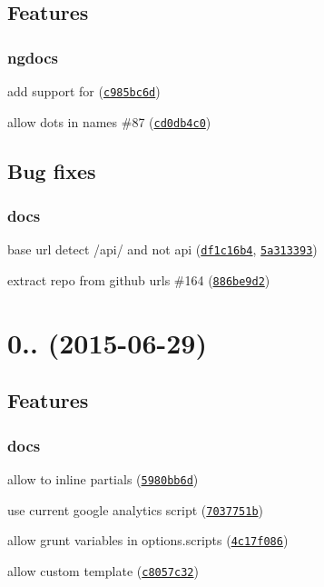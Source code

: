 \subsection*{Features}

\subsubsection*{ngdocs}


\begin{DoxyItemize}
\item add support for  (\href{https://github.com/m7r/grunt-ngdocs/commit/c985bc6d}{\tt c985bc6d})
\item allow dots in names \#87 (\href{https://github.com/m7r/grunt-ngdocs/commit/cd0db4c0}{\tt cd0db4c0})
\end{DoxyItemize}

\subsection*{Bug fixes}

\subsubsection*{docs}


\begin{DoxyItemize}
\item base url detect /api/ and not api (\href{https://github.com/m7r/grunt-ngdocs/commit/df1c16b4}{\tt df1c16b4}, \href{https://github.com/m7r/grunt-ngdocs/commit/5a313393}{\tt 5a313393})
\item extract repo from github urls \#164 (\href{https://github.com/m7r/grunt-ngdocs/commit/886be9d2}{\tt 886be9d2})
\end{DoxyItemize}

\section*{0.. (2015-\/06-\/29)}

\subsection*{Features}

\subsubsection*{docs}


\begin{DoxyItemize}
\item allow to inline partials (\href{https://github.com/m7r/grunt-ngdocs/commit/5980bb6d}{\tt 5980bb6d})
\item use current google analytics script (\href{https://github.com/m7r/grunt-ngdocs/commit/7037751b}{\tt 7037751b})
\item allow grunt variables in {\ttfamily options.\+scripts} (\href{https://github.com/m7r/grunt-ngdocs/commit/4c17f086}{\tt 4c17f086})
\item allow custom template (\href{https://github.com/m7r/grunt-ngdocs/commit/c8057c32}{\tt c8057c32})
\end{DoxyItemize}

